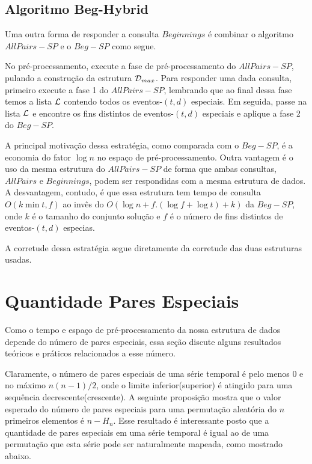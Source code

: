 \documentclass[dissertacao, brazil]{ThesisPUC}
\begin{document}
\subsection{Algoritmo Beg-Hybrid}

Uma outra forma de responder a consulta $Beginnings$ é combinar o algoritmo 
$AllPairs-SP$ e o $Beg-SP$ como segue. 

No pré-processamento, execute a fase de pré-processamento do $AllPairs-SP$, pulando
a construção da estrutura ${\cal D}_{max}$. Para responder uma dada consulta,
primeiro execute a fase 1 do $AllPairs-SP$, lembrando que ao final dessa fase
temos a lista ${\cal L}$ contendo todos os eventos-$(t,d)$ especiais. Em seguida,
passe na lista ${\cal L}$ e encontre os fins distintos de eventos-$(t,d)$ especiais e
aplique a fase 2 do $Beg-SP$. 

A principal motivação dessa estratégia, como comparada com o $Beg-SP$, é a economia
do fator $\log n$ no espaço de pré-processamento. Outra vantagem é o uso da mesma
estrutura do $AllPairs-SP$ de forma que ambas consultas, $AllPairs$ e $Beginnings$,
podem ser respondidas com a mesma estrutura de dados. A desvantagem, contudo,
é que essa estrutura tem tempo de consulta $O(k\min{t,f})$ ao invês do 
$O(\log n + f.(\log f + \log t) + k)$ da $Beg-SP$, onde $k$ é o tamanho
do conjunto solução e $f$ é o número de fins distintos de eventos-$(t,d)$
especias.

A corretude dessa estratégia segue diretamente da corretude das duas
estruturas usadas.

\section{Quantidade Pares Especiais}

Como o tempo e espaço de pré-processamento da nossa estrutura de dados
depende do número de pares especiais, essa seção discute alguns resultados
teóricos e práticos relacionados a esse número.

Claramente, o número de pares especiais de uma série temporal é pelo 
menos $0$ e no máximo $n(n - 1)/2$, onde o limite inferior(superior) é
atingido para uma sequência decrescente(crescente). A seguinte proposição
mostra que o valor esperado do número de pares especiais para uma permutação
aleatória do $n$ primeiros elementos é $n - H_n$. Esse resultado é interessante
posto que a quantidade de pares especiais em uma série temporal é igual ao de 
uma permutação que esta série pode ser naturalmente mapeada, como mostrado abaixo.
\end{document}

